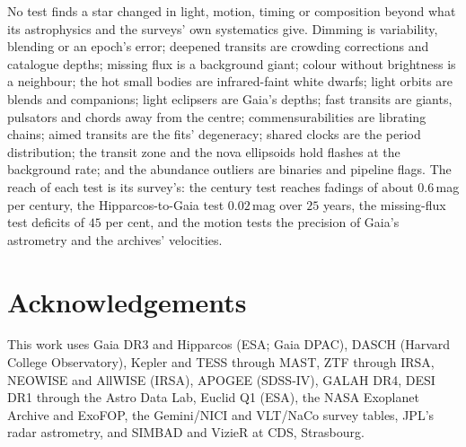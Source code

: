 \documentclass[3p,11pt]{elsarticle}
\begin{document}
No test finds a star changed in light, motion, timing or composition beyond what its
astrophysics and the surveys' own systematics give. Dimming is variability, blending or
an epoch's error; deepened transits are crowding corrections and catalogue depths; missing
flux is a background giant; colour without brightness is a
neighbour; the hot small bodies are infrared-faint white dwarfs; light orbits are blends
and companions; light eclipsers are Gaia's depths; fast transits are giants, pulsators
and chords away from the centre; commensurabilities are librating chains; aimed transits are the fits'
degeneracy; shared clocks are the period distribution; the transit zone and the nova
ellipsoids hold flashes at the background rate; and the abundance outliers are binaries
and pipeline flags. The reach of each test is its survey's: the century test reaches
fadings of about $0.6$\,mag per century, the Hipparcos-to-Gaia test $0.02$\,mag over
$25$ years, the missing-flux test deficits of $45$ per cent, and the motion tests the
precision of Gaia's astrometry and the archives' velocities.

\section*{Acknowledgements}

This work uses Gaia DR3 and Hipparcos (ESA; Gaia DPAC), DASCH (Harvard College
Observatory), Kepler and TESS through MAST, ZTF through IRSA, NEOWISE and AllWISE (IRSA),
APOGEE (SDSS-IV), GALAH DR4, DESI DR1 through the Astro Data Lab, Euclid Q1 (ESA), the
NASA Exoplanet Archive and ExoFOP, the Gemini/NICI and VLT/NaCo survey tables, JPL's radar
astrometry, and SIMBAD and VizieR at CDS, Strasbourg.
\end{document}
